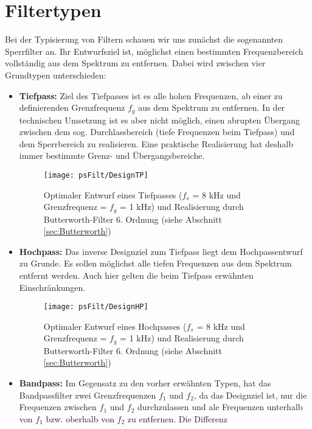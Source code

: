 \section{Filtertypen}
Bei der Typisierung von Filtern schauen wir uns zunächst die
sogenannten Sperrfilter an. Ihr Entwurfsziel ist, möglichst einen
bestimmten Frequenzbereich vollständig aus dem Spektrum zu
entfernen. Dabei wird zwischen vier Grundtypen unterschieden:
\begin{itemize}
    \item {\bf Tiefpass:} Ziel des Tiefpasses ist es alle hohen
    Frequenzen, ab einer zu definierenden Grenzfrequenz $f_g$ aus dem
    Spektrum zu entfernen. In der technischen Umsetzung ist es
    aber nicht möglich, einen abrupten Übergang zwischen
    dem sog. Durchlassbereich (tiefe Frequenzen beim Tiefpass) und
    dem Sperrbereich zu realisieren. Eine praktische Realisierung
    hat deshalb immer bestimmte Grenz- und Übergangsbereiche.
    \begin{figure}[H]
    \begin{center}
    \texttt{[image: psFilt/DesignTP]}
    \caption{\label{pic:DesignTP}Optimaler Entwurf eines Tiefpasses ($f_s$ = 8 kHz und
    Grenzfrequenz = $f_g$ = 1 kHz) und Realisierung durch Butterworth-Filter 6. Ordnung
    (siehe Abschnitt \ref{sec:Butterworth})}
    \end{center}
    \end{figure}
    \item {\bf Hochpass:} Das inverse Designziel zum Tiefpass
    liegt dem Hochpassentwurf zu Grunde. Es sollen möglichst alle
    tiefen Frequenzen aus dem Spektrum entfernt werden. Auch hier
    gelten die beim Tiefpass erwähnten Einschränkungen.
    \begin{figure}[H]
    \begin{center}
    \texttt{[image: psFilt/DesignHP]}
    \caption{\label{pic:DesignHP}Optimaler Entwurf eines Hochpasses ($f_s$ = 8 kHz und
    Grenzfrequenz = $f_g$ = 1 kHz) und Realisierung durch Butterworth-Filter 6. Ordnung
    (siehe Abschnitt \ref{sec:Butterworth})}
    \end{center}
    \end{figure}
    \item {\bf Bandpass:} Im Gegensatz zu den vorher erwähnten
    Typen, hat das Bandpassfilter zwei Grenzfrequenzen $f_1$ und
    $f_2$, da das Designziel ist, nur die Frequenzen zwischen
    $f_1$ und $f_2$ durchzulassen und ale Frequenzen unterhalb von
    $f_1$ bzw. oberhalb von $f_2$ zu entfernen. Die Differenz

\end{itemize}
